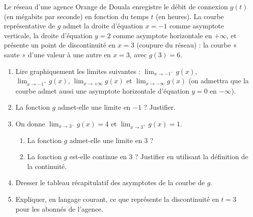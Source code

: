 \documentclass[11pt]{article}
\begin{document}
\begin{exercice}
Le réseau d'une agence Orange de Douala enregistre le débit de connexion $g(t)$ (en mégabits par seconde) en fonction du temps $t$ (en heures). La courbe représentative de $g$ admet la droite d'équation $x=-1$ comme asymptote verticale, la droite d'équation $y=2$ comme asymptote horizontale en $+\infty$, et présente un point de discontinuité en $x=3$ (coupure du réseau) : la courbe « saute » d'une valeur à une autre en $x=3$, avec $g(3)=6$.
\begin{enumerate}
\item Lire graphiquement les limites suivantes : $\displaystyle\lim_{x\to -1^-}g(x)$, $\displaystyle\lim_{x\to -1^+}g(x)$, $\displaystyle\lim_{x\to +\infty}g(x)$ et $\displaystyle\lim_{x\to -\infty}g(x)$ (on admettra que la courbe admet aussi une asymptote horizontale d'équation $y=0$ en $-\infty$).
\item La fonction $g$ admet-elle une limite en $-1$ ? Justifier.
\item On donne $\displaystyle\lim_{x\to 3^-}g(x)=4$ et $\displaystyle\lim_{x\to 3^+}g(x)=1$.
\begin{enumerate}
\item La fonction $g$ admet-elle une limite en $3$ ?
\item La fonction $g$ est-elle continue en $3$ ? Justifier en utilisant la définition de la continuité.
\end{enumerate}
\item Dresser le tableau récapitulatif des asymptotes de la courbe de $g$.
\item Expliquer, en langage courant, ce que représente la discontinuité en $t=3$ pour les abonnés de l'agence.
\end{enumerate}
\end{exercice}
\end{document}
